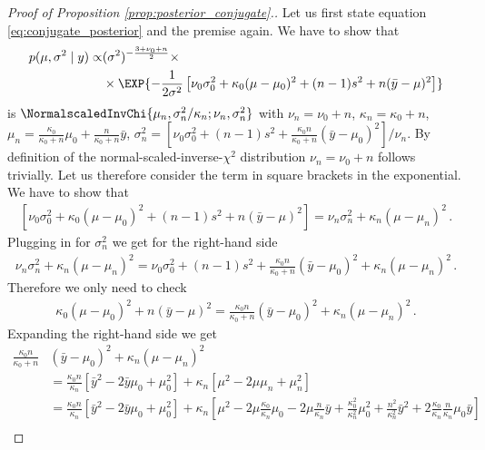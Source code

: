 \begin{proof}[Proof of Proposition \ref{prop:posterior_conjugate}.]
Let us first state equation \ref{eq:conjugate_posterior} and the premise again.
We have to show that
\begin{align*}
  p(\mu, \sigma^2 \mid y) \propto& (\sigma^2)^{-\frac{3 + \nu_0 + n}{2}} \times\\
  & \times \EXP{-\frac{1}{2 \sigma^2} \left[\nu_0\sigma_0^2 + \kappa_0(\mu - \mu_0)^2 + (n-1)s^2 + n(\bar{y} - \mu)^2 \right]}
\end{align*}
is $\NormalscaledInvChi{\mu_n, \sigma_n^2/\kappa_n; \nu_n, \sigma_n^2}$ with $\nu_n = \nu_0 + n$, $\kappa_n = \kappa_0 + n$, $\mu_n =\frac{\kappa_0}{\kappa_0 + n}\mu_0 + \frac{n}{\kappa_0 + n}\bar{y}$, $\sigma_n^2 = \left[\nu_0 \sigma_0^2 + (n-1)s^2 + \frac{\kappa_0 n}{\kappa_0 + n} (\bar{y} - \mu_0)^2\right] /\nu_n$.
By definition of the normal-scaled-inverse-$\chi^2$ distribution $\nu_n = \nu_0 + n$ follows trivially.
Let us therefore consider the term in square brackets in the exponential.
We have to show that
\begin{align*}
  \left[\nu_0\sigma_0^2 + \kappa_0(\mu - \mu_0)^2 + (n-1)s^2 + n(\bar{y} - \mu)^2 \right] = \nu_n \sigma_n^2 + \kappa_n (\mu - \mu_n)^2 \,.
\end{align*}
Plugging in for $\sigma_n^2$ we get for the right-hand side
\begin{align*}
  \nu_n \sigma_n^2 + \kappa_n (\mu - \mu_n)^2 = \nu_0 \sigma_0^2 + (n-1)s^2 + \frac{\kappa_0 n}{\kappa_0 + n} (\bar{y} - \mu_0)^2 + \kappa_n (\mu- \mu_n)^2 \,.
\end{align*}
Therefore we only need to check
\begin{align*}
  \kappa_0(\mu - \mu_0)^2 + n(\bar{y} - \mu)^2 = \frac{\kappa_0 n}{\kappa_0 + n} (\bar{y} - \mu_0)^2 + \kappa_n (\mu- \mu_n)^2 \,.
\end{align*}
Expanding the right-hand side we get
\begin{align*}
\frac{\kappa_0 n}{\kappa_0 + n} &(\bar{y} - \mu_0)^2 + \kappa_n (\mu- \mu_n)^2\\
&=\frac{\kappa_0 n}{\kappa_n}\left[\bar{y}^2 - 2\bar{y}\mu_0 + \mu_0^2 \right] + \kappa_n \left[\mu^2 - 2\mu\mu_n + \mu_n^2 \right]\\
&=\frac{\kappa_0 n}{\kappa_n}\left[\bar{y}^2 - 2\bar{y}\mu_0 + \mu_0^2 \right] + \kappa_n \left[\mu^2 - 2\mu\frac{\kappa_0}{\kappa_n}\mu_0 - 2\mu\frac{n}{\kappa_n}\bar{y} + \frac{\kappa_0^2}{\kappa_n^2}\mu_0^2 + \frac{n^2}{\kappa_n^2} \bar{y}^2 + 2\frac{\kappa_0}{\kappa_n} \frac{n}{\kappa_n}\mu_0\bar{y} \right]\\

\end{align*}
\end{proof}
